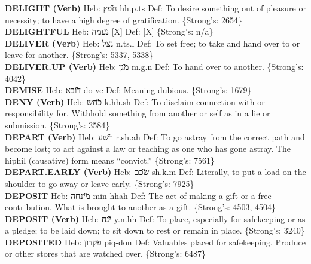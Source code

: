{\textbf{DELIGHT (Verb)} Heb: {\large\H חפץ} hh.p.ts Def: To desire something out of pleasure or necessity; to have a high degree of gratification. \{Strong's: 2654\}\hfill{}\\

\textbf{DELIGHTFUL} Heb: {\large\H נעמה} {[}X{]} Def: {[}X{]} \{Strong's: n/a\}\hfill{}\\

\textbf{DELIVER (Verb)} Heb: {\large\H נצל} n.ts.l Def: To set free; to take and hand over to or leave for another. \{Strong's: 5337, 5338\}\hfill{}\\

\textbf{DELIVER.UP (Verb)} Heb: {\large\H מגן} m.g.n Def: To hand over to another. \{Strong's: 4042\}\hfill{}\\

\textbf{DEMISE} Heb: {\large\H דובא} do-ve Def: Meaning dubious. \{Strong's: 1679\}\hfill{}\\

\textbf{DENY (Verb)} Heb: {\large\H כחש} k.hh.sh Def: To disclaim connection with or responsibility for. Withhold something from another or self as in a lie or submission. \{Strong's: 3584\}\hfill{}\\

\textbf{DEPART (Verb)} Heb: {\large\H רשע} r.sh.ah Def: To go astray from the correct path and become lost; to act against a law or teaching as one who has gone astray. The hiphil (causative) form means ``convict.'' \{Strong's: 7561\}\hfill{}\\

\textbf{DEPART.EARLY (Verb)} Heb: {\large\H שכם} sh.k.m Def: Literally, to put a load on the shoulder to go away or leave early. \{Strong's: 7925\}\hfill{}\\

\textbf{DEPOSIT} Heb: {\large\H מינחה} min-hhah Def: The act of making a gift or a free contribution. What is brought to another as a gift. \{Strong's: 4503, 4504\}\hfill{}\\

\textbf{DEPOSIT (Verb)} Heb: {\large\H ינח} y.n.hh Def: To place, especially for safekeeping or as a pledge; to be laid down; to sit down to rest or remain in place. \{Strong's: 3240\}\hfill{}\\

\textbf{DEPOSITED} Heb: {\large\H פקדון} piq-don Def: Valuables placed for safekeeping. Produce or other stores that are watched over. \{Strong's: 6487\}\hfill{}\\

}
